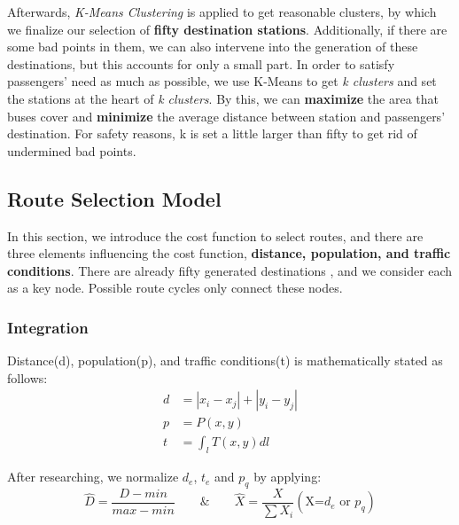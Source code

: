 \documentclass{mcmthesis}
\begin{document}
Afterwards, \emph{K-Means Clustering} is applied to get reasonable clusters, by which we finalize our selection of \textbf{fifty destination stations}. Additionally, if there are some bad points in them, we can also intervene into the generation of these destinations, but this accounts for only a small part.  In order to satisfy passengers' need as much as possible, we use K-Means to get \emph{k clusters} and set the stations at the heart of \emph{k clusters}. By this, we can \textbf{maximize} the area that buses cover and \textbf{minimize} the average distance between station and passengers' destination. For safety reasons, k is set a little larger than fifty to get rid of undermined bad points.

\subsection{Route Selection Model}
In this section, we introduce the cost function to select routes, and there are three elements influencing the cost function, \textbf{distance, population, and traffic conditions}. There are already fifty generated destinations , and we consider each as a key node. Possible route cycles only connect these nodes. 

\subsubsection{Integration}\label{sec:inte}
Distance(d), population(p), and traffic conditions(t) is mathematically stated as follows:
\begin{equation*}
    \begin{split}
        d &= |x_i-x_j| + |y_i-y_j|\\
        p &= P(x,y)\\
        t &= \int_{l}T(x,y)dl
    \end{split}
\end{equation*}

After researching, we normalize $d_e$, $t_e$ and $p_q$ by applying:
\begin{equation*}
    \hat{D}=\frac{D - min}{max - min} \qquad \& \qquad \hat{X}=\frac{X}{\sum X_i}\left(\text{X=$d_e$ or $p_q$}\right)
\end{equation*}
\end{document}
